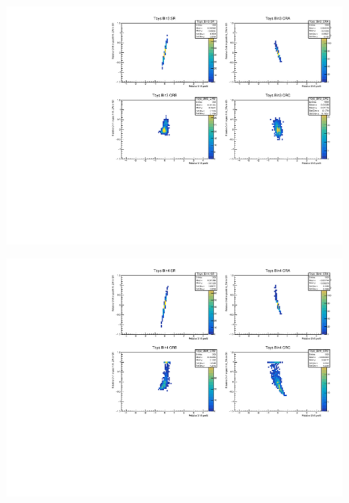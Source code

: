\begin{figure}[H]
\includegraphics[width=\textwidth]{plots/diffx/instab/linearfx/instabilities_mjj_QCD_Sh2211_Signal_Sh2211_BSDATASTATS_linearfx_newbinning_madgraphasimov_bin3.pdf}
\end{figure}
\begin{figure}[H]
\includegraphics[width=\textwidth]{plots/diffx/instab/linearfx/instabilities_mjj_QCD_Sh2211_Signal_Sh2211_BSDATASTATS_linearfx_newbinning_madgraphasimov_bin4.pdf}
\end{figure}

